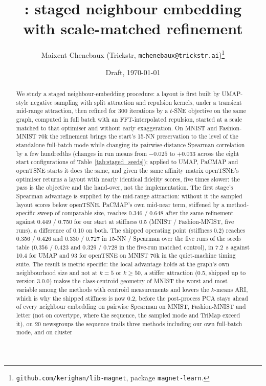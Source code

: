 \documentclass[11pt]{article}
\title{\magnet: staged neighbour embedding\\ with scale-matched refinement}
\author{Maixent Chenebaux (Trickstr, \texttt{mchenebaux@trickstr.ai})\thanks{\texttt{github.com/kerighan/lib-magnet}, package \texttt{magnet-learn}.}}
\date{Draft, \today}
\begin{document}
\maketitle

\begin{abstract}
We study a staged neighbour-embedding procedure: a layout is first built by UMAP-style negative
sampling with split attraction and repulsion kernels, under a transient mid-range attraction, then
refined for 300 iterations by a $t$-SNE objective on the same graph, computed in full batch with an
FFT-interpolated repulsion, started at a scale matched to that optimiser and without early
exaggeration. On MNIST and Fashion-MNIST 70k the refinement brings the start's 15-NN preservation to
the level of the standalone full-batch mode while changing its pairwise-distance Spearman correlation
by a few hundredths (changes in run means from $-0.025$ to $+0.033$ across the eight start
configurations of Table~\ref{tab:staged_seeds}); applied to UMAP, PaCMAP and openTSNE
starts it does the same, and given the same affinity matrix openTSNE's optimiser returns a layout with
nearly identical fidelity scores, five times slower: the pass is the objective and the hand-over, not
the implementation. The first
stage's Spearman advantage is supplied by the mid-range attraction: without it the sampled layout scores
below openTSNE. PaCMAP's own mid-near term, stiffened by a method-specific sweep of comparable size, reaches 0.346 / 0.648
after the same refinement against 0.449 / 0.750 for our start at stiffness 0.5 (MNIST / Fashion-MNIST, five runs), a
difference of 0.10 on both. The shipped operating point (stiffness 0.2) reaches 0.356 / 0.426 and 0.330 / 0.727 in 15-NN
/ Spearman over the five runs of the seeds table (0.356 / 0.423 and 0.329 / 0.728 in the five-run matched control),
in 7.2~s against 10.4 for UMAP and 93 for openTSNE on MNIST 70k in the quiet-machine timing suite. The result is metric
specific: the local advantage holds at the graph's own neighbourhood size and not at $k = 5$ or
$k \ge 50$, a stiffer attraction (0.5, shipped up to version 3.0.0) makes the class-centroid geometry of MNIST the worst and most variable
among the methods with centroid measurements and lowers the $k$-means ARI, which is why the shipped stiffness is now 0.2, before the post-process PCA stays ahead of every neighbour embedding on pairwise Spearman on MNIST, Fashion-MNIST and letter (not on covertype, where the sequence, the sampled mode and TriMap exceed it),
on 20 newsgroups the sequence trails three methods including our own full-batch mode, and on cluster

\end{abstract}
\end{document}
